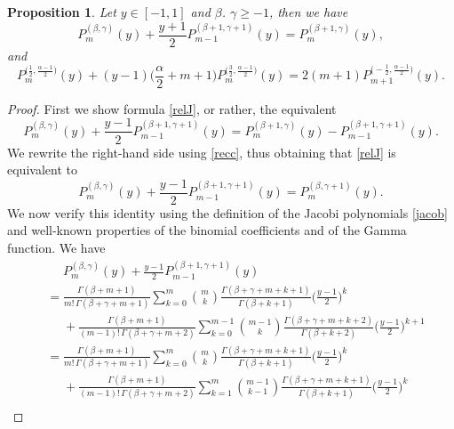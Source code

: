 \documentclass[reqno,11pt]{amsart}
\newtheorem{proposition}[theorem]{Proposition}
\theoremstyle{definition}
\begin{document}
\begin{proposition}
	Let $y \in [-1,1]$ and $\beta$. $\gamma \geq -1$, then we have
	\begin{equation}
		\label{relJ}
		P^{(\beta, \gamma)}_m(y)+\frac{y+1}{2}P^{(\beta+1, \gamma+1)}_{m-1}(y)=P^{(\beta+1, \gamma)}_m(y),
	\end{equation}
	and
	\begin{equation}
		\label{relJ3}
		P_m^{\big(\frac{1}{2}, \frac{\alpha-1}{2}\big)}(y)+(y-1)\Big(\frac{\alpha}{2}+m+1\Big)P_m^{\big(\frac{3}{2}, \frac{\alpha-1}{2}\big)}(y)=2(m+1) P_{m+1}^{\big(-\frac{1}{2}, \frac{\alpha-1}{2}\big)}(y).
	\end{equation}
\end{proposition}
\begin{proof}
First we show formula \eqref{relJ}, or rather, the equivalent
	\begin{equation*}
		\label{relJ1}
		P_m^{(\beta, \gamma)}(y)+ \frac{y-1}{2}P_{m-1}^{(\beta+1, \gamma+1)}(y)=P^{(\beta+1, \gamma)}_m(y)-P^{(\beta+1, \gamma+1)}_{m-1}(y).
	\end{equation*}
	We rewrite the right-hand side using \eqref{recc}, thus obtaining that \eqref{relJ} is equivalent to
	\begin{equation*}
		P_m^{(\beta, \gamma)}(y)+ \frac{y-1}{2}P_{m-1}^{(\beta+1, \gamma+1)}(y)=P^{(\beta, \gamma+1)}_{m}(y).
	\end{equation*}
	We now verify this identity using the definition of the Jacobi polynomials \eqref{jacob} and well-known properties of the binomial coefficients and of the Gamma function. We have
			\begingroup\allowdisplaybreaks
	\begin{align*}
		&\phantom{=}P_m^{(\beta, \gamma)}(y)+ \frac{y-1}{2}P_{m-1}^{(\beta+1, \gamma+1)}(y)\\
		&= \frac{\Gamma(\beta+m+1)}{m!\,\Gamma(\beta+\gamma+m+1)} \sum_{k=0}^{m} \binom{m}{k} \frac{\Gamma(\beta+\gamma+m+k+1)}{\Gamma(\beta+k+1)} \bigg(\frac{y-1}{2}\bigg)^{k}\\
		&\phantom{=}+\frac{\Gamma(\beta+m+1)}{(m-1)!\, \Gamma(\beta+\gamma+m+2)} \sum_{k=0}^{m-1} \binom{m-1}{k} \frac{\Gamma(\beta+\gamma+m+k+2)}{\Gamma(\beta+k+2)} \bigg(\frac{y-1}{2}\bigg)^{k+1}\\
		&=\frac{\Gamma(\beta+m+1)}{m!\,\Gamma(\beta+\gamma+m+1)} \sum_{k=0}^{m} \binom{m}{k} \frac{\Gamma(\beta+\gamma+m+k+1)}{\Gamma(\beta+k+1)} \bigg(\frac{y-1}{2}\bigg)^{k}\\
		&\phantom{=} +\frac{\Gamma(\beta+m+1)}{(m-1)!\, \Gamma(\beta+\gamma+m+2)}\sum_{k=1}^{m} \binom{m-1}{k-1} \frac{\Gamma(\beta+\gamma+m+k+1)}{\Gamma(\beta+k+1)} \bigg(\frac{y-1}{2}\bigg)^{k}\\

\end{align*}
\end{proof}
\end{document}
